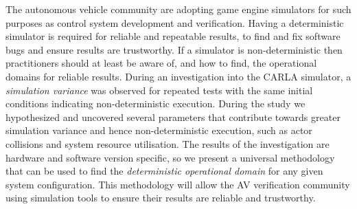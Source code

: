 \documentclass[letterpaper, 10 pt, journal, twoside]{IEEEtran}
\begin{document}

The autonomous vehicle community are adopting game engine simulators for such purposes as control system development and verification. Having a deterministic simulator is required for reliable and repeatable results,  to find and fix software bugs and ensure results are trustworthy. If a simulator is non-deterministic then practitioners should at least be aware of, and how to find, the operational domains for reliable results. During an investigation into the CARLA simulator, a \textit{simulation variance} was observed for repeated tests with the same initial conditions indicating non-deterministic execution. During the study we hypothesized and uncovered several parameters that contribute towards greater simulation variance and hence non-deterministic execution, such as actor collisions and system resource utilisation. The results of the investigation are hardware and software version specific, so we present a universal methodology that can be used to find the \textit{deterministic operational domain} for any given system configuration. This methodology will allow the AV verification community using simulation tools to ensure their results are reliable and trustworthy.
\end{document}
